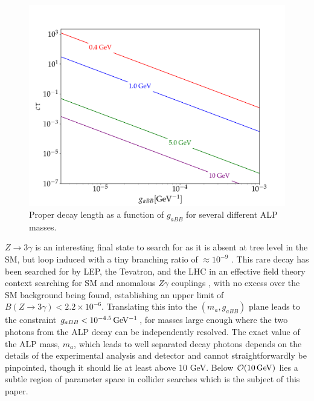 \documentclass[aps,onecolumn,twoside,secnumarabic,12pt,balancelastpage,amsmath,amssymb,nofootinbib,hyperref=pdftex]{revtex4}
\begin{document}
\begin{figure}[t]
\begin{center}
\includegraphics[width=12cm]{decay_length.png}
\caption{Proper decay length as a function of $g_{aBB}$ for several different ALP masses.}
\label{fig:decay_length}
\end{center}
\end{figure}
\vskip 0.12in
$Z\rightarrow 3\gamma$ is an interesting final state to search for as it is absent at tree level in the SM, but loop induced with a tiny branching ratio of $\approx 10^{-9}$ \cite{zphotonSM}. This rare decay has been searched for by LEP, the Tevatron, and the LHC in an effective field theory context searching for SM and anomalous $Z\gamma$ couplings \cite{Acciarri:1994gb, Aaltonen:2013mfa, Aad:2015bua}, with no excess over the SM background being found, establishing an upper limit of $B(Z\rightarrow 3\gamma) < 2.2\times10^{-6}$. Translating this into the $(m_{a}, g_{a BB})$ plane leads to the constraint $g_{a BB} < 10^{-4.5}\,\rm{GeV^{-1}}$, for masses large enough where the two photons from the ALP decay can be independently resolved. The exact value of the ALP mass, $m_{a}$, which leads to well separated decay photons depends on the details of the experimental analysis and detector and cannot straightforwardly be pinpointed, though it should lie at least above 10 GeV. Below $\mathcal{O}(10\,\rm{GeV})$ lies a subtle region of parameter space in collider searches which is the subject of this paper.
\vskip 0.12in
\end{document}
